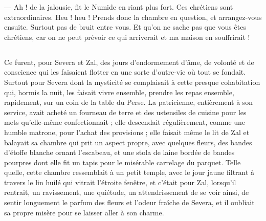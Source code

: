 \documentclass[a4paper, 11pt, oneside, polutonikogreek, french]{article}
\begin{document}
--- Ah ! de la jalousie, fit le Numide en riant plus fort. Ces chrétiens sont extraordinaires. Heu ! heu ! Prends donc la chambre en question, et arrangez-vous ensuite. Surtout pas de bruit entre vous. Et qu'on ne sache pas que vous êtes chrétiens, car on ne peut prévoir ce qui arriverait et ma maison en souffrirait !
\clearpage
\subsection{}
\paragraph{}
Ce furent, pour Severa et Zal, des jours d'endormement d'âme, de volonté et de conscience qui les faisaient flotter en une sorte d'outre-vie où tout se fondait. Surtout pour Severa dont la mysticité se complaisait à cette presque cohabitation qui, hormis la nuit, les faisait vivre ensemble, prendre les repas ensemble, rapidement, sur un coin de la table du Perse. La patricienne, entièrement à son service, avait acheté un fourneau de terre et des ustensiles de cuisine pour les mets qu'elle-même confectionnait ; elle descendait régulièrement, comme une humble matrone, pour l'achat des provisions ; elle faisait même le lit de Zal et balayait sa chambre qui prit un aspect propre, avec quelques fleurs, des bandes d'étoffe blanche ornant l'escabeau, et une stola de laine bordée de bandes pourpres dont elle fit un tapis pour le misérable carrelage du parquet. Telle quelle, cette chambre ressemblait à un petit temple, avec le jour jaune filtrant à travers le lin huilé qui vitrait l'étroite fenêtre, et c'était pour Zal, lorsqu'il rentrait, un ravissement, une quiétude, un attendrissement de se voir ainsi, de sentir longuement le parfum des fleurs et l'odeur fraîche de Severa, et il oubliait sa propre misère pour se laisser aller à son charme.
\end{document}
